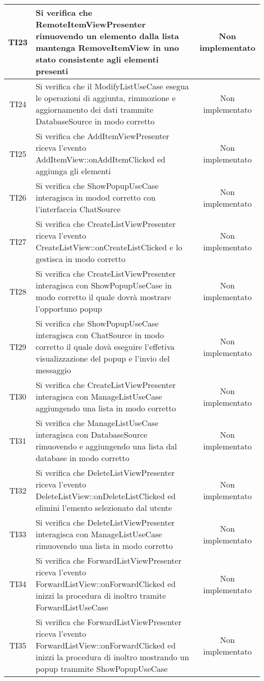 \begin{center}
\begin{longtable}{|c|>{\centering}m{10cm}|c|}
		TI23 & Si verifica che RemoteItemViewPresenter rimuovendo un elemento dalla lista mantenga RemoveItemView in uno stato consistente agli elementi presenti & Non implementato \\ \hline
		TI24 & Si verifica che il ModifyListUseCase esegua le operazioni di aggiunta, rimmozione e aggiornamento dei dati trammite DatabaseSource in modo corretto & Non implementato \\ \hline
		TI25 & Si verifica che AddItemViewPresenter riceva l'evento AddItemView::onAddItemClicked ed aggiunga gli elementi & Non implementato \\ \hline
		TI26 & Si verifica che ShowPopupUseCase interagisca in modod corretto con l'interfaccia ChatSource & Non implementato \\ \hline
		TI27 & Si verifica che CreateListViewPresenter riceva l'evento CreateListView::onCreateListClicked e lo gestisca in modo corretto & Non implementato \\ \hline
		TI28 & Si verifica che CreateListViewPresenter interagisca con ShowPopupUseCase in modo corretto il quale dovrà mostrare l'opportuno popup & Non implementato \\ \hline
		TI29 & Si verifica che ShowPopupUseCase interagisca con ChatSource in modo corretto il quale dovà eseguire l'effetiva visualizzazione del popup e l'invio del messaggio & Non implementato \\ \hline
		TI30 & Si verifica che CreateListViewPresenter interagisca con ManageListUseCase aggiungendo una lista in modo corretto & Non implementato \\ \hline
		TI31 & Si verifica che ManageListUseCase interagisca con DatabaseSource rimuovendo e aggiungendo una lista dal database in modo corretto & Non implementato \\ \hline
		TI32 & Si verifica che DeleteListViewPresenter riceva l'evento DeleteListView::onDeleteListClicked ed elimini l'emento selezionato dal utente & Non implementato \\ \hline
		TI33 & Si verifica che DeleteListViewPresenter interagisca con ManageListUseCase rimuovendo una lista in modo corretto & Non implementato \\ \hline
		TI34 & Si verifica che ForwardListViewPresenter riceva l'evento ForwardListView::onForwardClicked ed inizzi la procedura di inoltro tramite ForwardListUseCase & Non implementato \\ \hline
		TI35 & Si verifica che ForwardListViewPresenter riceva l'evento ForwardListView::onForwardClicked ed inizzi la procedura di inoltro mostrando un popup trammite ShowPopupUseCase & Non implementato \\ \hline

\end{longtable}
\end{center}
